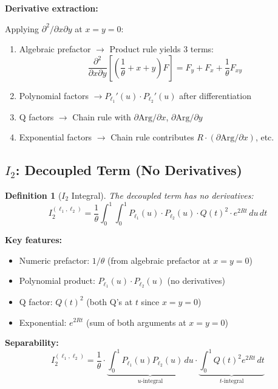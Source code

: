 \documentclass[11pt]{article}
\newtheorem{definition}{Definition}
\begin{document}
\textbf{Derivative extraction:}

Applying $\partial^2/\partial x \partial y$ at $x = y = 0$:
\begin{enumerate}
\item Algebraic prefactor $\to$ Product rule yields 3 terms:
  \begin{equation}
  \frac{\partial^2}{\partial x \partial y}\left[\left(\frac{1}{\theta} + x + y\right) F\right] = F_y + F_x + \frac{1}{\theta} F_{xy}
  \end{equation}
\item Polynomial factors $\to P_{\ell_1}'(u) \cdot P_{\ell_2}'(u)$ after differentiation
\item Q factors $\to$ Chain rule with $\partial \text{Arg}/\partial x$, $\partial \text{Arg}/\partial y$
\item Exponential factors $\to$ Chain rule contributes $R \cdot (\partial \text{Arg}/\partial x)$, etc.
\end{enumerate}

\subsection{$I_2$: Decoupled Term (No Derivatives)}

\begin{definition}[$I_2$ Integral]
The decoupled term has no derivatives:
\begin{equation}
\boxed{
I_2^{(\ell_1,\ell_2)} = \frac{1}{\theta} \int_0^1 \int_0^1 P_{\ell_1}(u) \cdot P_{\ell_2}(u) \cdot Q(t)^2 \cdot e^{2Rt} \, du\, dt
}
\end{equation}
\end{definition}

\textbf{Key features:}
\begin{itemize}
\item Numeric prefactor: $1/\theta$ (from algebraic prefactor at $x=y=0$)
\item Polynomial product: $P_{\ell_1}(u) \cdot P_{\ell_2}(u)$ (no derivatives)
\item Q factor: $Q(t)^2$ (both Q's at $t$ since $x=y=0$)
\item Exponential: $e^{2Rt}$ (sum of both arguments at $x=y=0$)
\end{itemize}

\textbf{Separability:}
\begin{equation}
I_2^{(\ell_1,\ell_2)} = \frac{1}{\theta} \cdot \underbrace{\int_0^1 P_{\ell_1}(u) P_{\ell_2}(u) \, du}_{\text{$u$-integral}} \cdot \underbrace{\int_0^1 Q(t)^2 e^{2Rt} \, dt}_{\text{$t$-integral}}
\end{equation}
\end{document}
